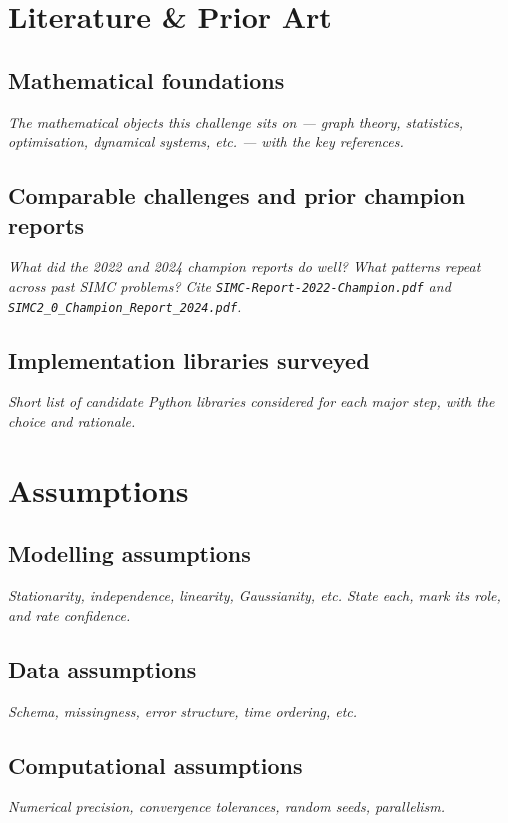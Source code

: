 \documentclass[12pt,a4paper]{article}
\newcommand{\ph}[1]{\textit{\textcolor{phgray}{#1}}}
\begin{document}
\section{Literature \& Prior Art}
\subsection{Mathematical foundations}
\ph{The mathematical objects this challenge sits on — graph theory, statistics, optimisation, dynamical systems, etc. — with the key references.}

\subsection{Comparable challenges and prior champion reports}
\ph{What did the 2022 and 2024 champion reports do well? What patterns repeat across past SIMC problems? Cite \texttt{SIMC-Report-2022-Champion.pdf} and \texttt{SIMC2\_0\_Champion\_Report\_2024.pdf}.}

\subsection{Implementation libraries surveyed}
\ph{Short list of candidate Python libraries considered for each major step, with the choice and rationale.}

\section{Assumptions}
\subsection{Modelling assumptions}
\ph{Stationarity, independence, linearity, Gaussianity, etc. State each, mark its role, and rate confidence.}

\subsection{Data assumptions}
\ph{Schema, missingness, error structure, time ordering, etc.}

\subsection{Computational assumptions}
\ph{Numerical precision, convergence tolerances, random seeds, parallelism.}
\end{document}
